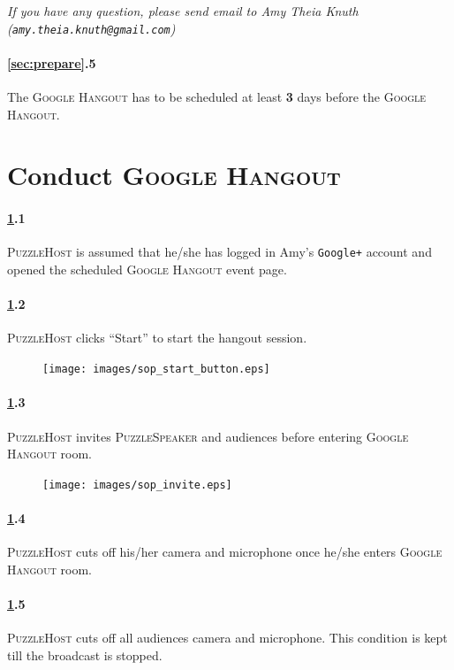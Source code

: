 \documentclass{article}
\newcommand{\hangout}{\textsc{Google Hangout}\xspace}
\newcommand{\host}{\textsc{PuzzleHost}\xspace}
\newcommand{\speaker}{\textsc{PuzzleSpeaker}\xspace}
\begin{document}
\emph{If you have any question, please send email to Amy Theia Knuth (\texttt{amy.theia.knuth@gmail.com})}

\paragraph{\ref{sec:prepare}.5} The \hangout has to be scheduled at least \textbf{3} days before the \hangout.

\clearpage
\section{Conduct \hangout} \label{sec:conduct}

\paragraph{\ref{sec:conduct}.1} \host is assumed that he/she has logged in Amy's \texttt{Google+} account and opened the scheduled \hangout event page.

\paragraph{\ref{sec:conduct}.2} \host clicks ``Start'' to start the hangout session.

\begin{figure}[!htm]
\centering
\texttt{[image: images/sop\_start\_button.eps]}
\end{figure}

\paragraph{\ref{sec:conduct}.3} \host invites \speaker and audiences before entering \hangout room.

\begin{figure}[!htm]
\centering
\texttt{[image: images/sop\_invite.eps]}
\end{figure}

\paragraph{\ref{sec:conduct}.4} \host cuts off his/her camera and microphone once he/she enters \hangout room.

\paragraph{\ref{sec:conduct}.5} \host cuts off all audiences camera and microphone. This condition is kept till the broadcast is stopped.
\end{document}
